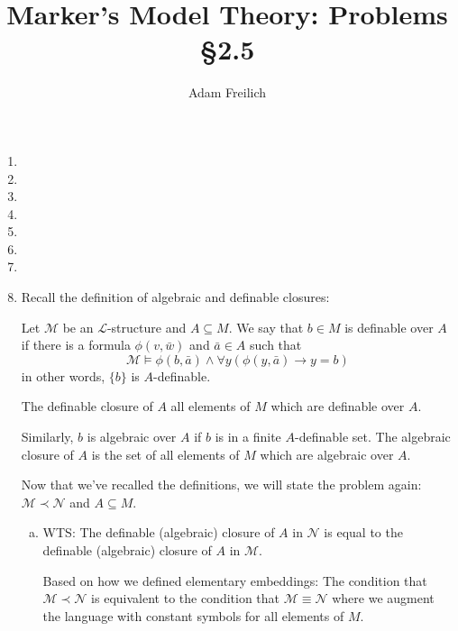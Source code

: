 \documentclass[10pt]{article}
\author{Adam Freilich}
\title{Marker's Model Theory: Problems \S 2.5}
\newcommand{\A}{\forall}
\newcommand{\mcM}{\mathcal{M}}
\newcommand{\mcN}{\mathcal{N}}
\newcommand{\mcL}{\mathcal{L}}
\begin{document}
\maketitle


\begin{enumerate}[1.]
\item
 
\item
 
\item
 
\item
 
\item

\item
 
\item
 
\item %
Recall the definition of algebraic and definable closures:

Let \(\mcM\) be an \(\mcL\)-structure and \(A \subseteq M\). 
We say that \(b \in M\) is definable over \(A\) if there is a formula \(\phi(v, \bar{w})\) and \(\bar{a} \in A\) such that
\[\mcM \models \phi(b, \bar{a}) \land \A y (\phi(y, \bar{a}) \to y = b)\]
in other words, \(\{b\}\) is \(A\)-definable. 

The definable closure of \(A\) all elements of \(M\) which are definable over \(A\).

Similarly, \(b\) is algebraic over \(A\) if \(b\) is in a finite \(A\)-definable set. 
The algebraic closure of \(A\) is the set of all elements of \(M\) which are algebraic over \(A\).

Now that we've recalled the definitions, we will state the problem again: 
\(\mcM \prec \mcN\) and \(A \subseteq M\).
\begin{enumerate}[a)]
  \item WTS: The definable (algebraic) closure of \(A\) in \(\mcN\) is equal to the definable (algebraic) closure of \(A\) in \(\mcM\).

  Based on how we defined elementary embeddings: The condition that \(\mcM \prec \mcN\) is equivalent to the condition that \(\mcM \equiv \mcN\) where we augment the language with constant symbols for all elements of \(M\). 


\end{enumerate}
\end{enumerate}
\end{document}
